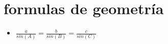 \section{formulas de geometría}
\begin{itemize}
\item $\frac{a}{sin(A)}=\frac{b}{sin(B)}=\frac{c}{sin(C)}$
\end{itemize}
